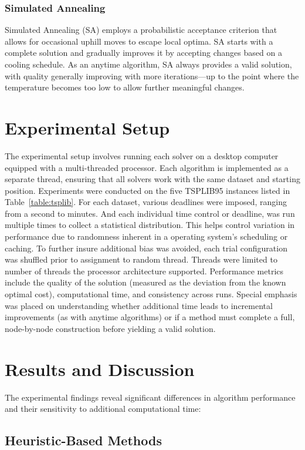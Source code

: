 \documentclass[11pt]{article}
\begin{document}
	\subsubsection{Simulated Annealing}
	Simulated Annealing (SA) employs a probabilistic acceptance criterion that allows for occasional uphill moves to escape local optima. SA starts with a complete solution and gradually improves it by accepting changes based on a cooling schedule. As an anytime algorithm, SA always provides a valid solution, with quality generally improving with more iterations—up to the point where the temperature becomes too low to allow further meaningful changes.
	
	\section{Experimental Setup}
	The experimental setup involves running each solver on a desktop computer equipped with a multi-threaded processor. Each algorithm is implemented as a separate thread, ensuring that all solvers work with the same dataset and starting position. Experiments were conducted on the five TSPLIB95 instances listed in Table~\ref{table:tsplib}. For each dataset, various deadlines were imposed, ranging from a second to minutes. And each individual time control or deadline, was run multiple times to collect a statistical distribution. This helps control variation in performance due to randomness inherent in a operating system's scheduling or caching. To further insure additional bias was avoided, each trial configuration was shuffled prior to assignment to random thread. Threads were limited to number of threads the processor architecture supported.
	Performance metrics include the quality of the solution (measured as the deviation from the known optimal cost), computational time, and consistency across runs. Special emphasis was placed on understanding whether additional time leads to incremental improvements (as with anytime algorithms) or if a method must complete a full, node-by-node construction before yielding a valid solution.
	
	\section{Results and Discussion}
	The experimental findings reveal significant differences in algorithm performance and their sensitivity to additional computational time:
	
	\subsection{Heuristic-Based Methods}
	
\end{document}
